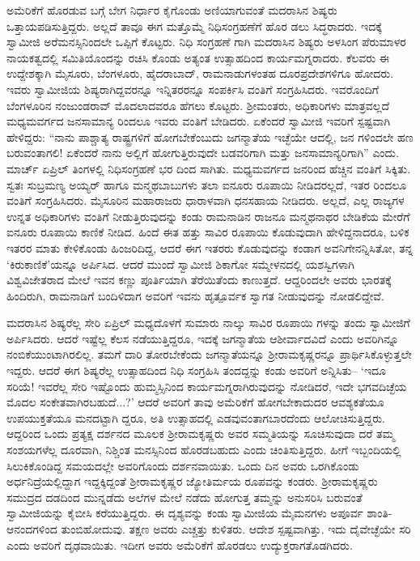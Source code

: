 ಅಮೆರಿಕೆಗೆ ಹೊರಡುವ ಬಗ್ಗೆ ಬೇಗ ನಿರ್ಧಾರ ಕೈಗೊಂಡು ಅಣಿಯಾಗುವಂತೆ ಮದರಾಸಿನ ಶಿಷ್ಯರು ಒತ್ತಾಯಪಡಿಸುತ್ತಿದ್ದರು. ಅಲ್ಲದೆ ತಾವೂ ಈಗ ಮತ್ತೊಮ್ಮೆ ನಿಧಿಸಂಗ್ರಹಣೆಗೆ ಹೊರ ಡಲು ಸಿದ್ಧರಾದರು. ಇದಕ್ಕೆ ಸ್ವಾಮೀಜಿ ಅರೆಮನಸ್ಸಿನಿಂದಲೇ ಒಪ್ಪಿಗೆ ಕೊಟ್ಟರು. ನಿಧಿ ಸಂಗ್ರಹಣೆ ಗಾಗಿ ಮದರಾಸಿನ ಶಿಷ್ಯರು ಅಳಸಿಂಗ ಪೆರುಮಾಳರ ನಾಯಕತ್ವದಲ್ಲಿ ಸಮಿತಿಯೊಂದನ್ನು ರಚಿಸಿ ಕೊಂಡು ಅತ್ಯಂತ ಉತ್ಸಾಹದಿಂದ ಕಾರ್ಯಮಗ್ನರಾದರು. ಕೆಲವರು ಈ ಉದ್ದೇಶಕ್ಕಾಗಿ ಮೈಸೂರು, ಬೆಂಗಳೂರು, ಹೈದರಾಬಾದ್, ರಾಮನಾಡುಗಳಂತಹ ದೂರಪ್ರದೇಶಗಳಿಗೂ ಹೋದರು. ಇವರು ಸ್ವಾಮೀಜಿಯ ಶಿಷ್ಯರಾಗಿದ್ದವರನ್ನೂ ಇನ್ನಿತರರನ್ನೂ ಸಂಪರ್ಕಿಸಿ ವಂತಿಗೆ ಸಂಗ್ರಹಿಸಿದರು. ಇವರೊಂದಿಗೆ ಬೆಂಗಳೂರಿನ ನಂಜುಂಡರಾವ್ ಮೊದಲಾದವರೂ ಹೆಗಲು ಕೊಟ್ಟರು. ಶ್ರೀಮಂತರು, ಅಧಿಕಾರಿಗಳು ಮಾತ್ರವಲ್ಲದೆ ಮಧ್ಯಮವರ್ಗದ ಜನಸಾಮಾನ್ಯ ರಿಂದಲೂ ಇವರು ವಂತಿಗೆ ಬೇಡಿದರು. ಏಕೆಂದರೆ ಸ್ವಾಮೀಜಿ ಇವರಿಗೆ ಸ್ಪಷ್ಟವಾಗಿ ಹೇಳಿದ್ದರು: “ನಾನು ಪಾಶ್ಚಾತ್ಯ ರಾಷ್ಟ್ರಗಳಿಗೆ ಹೋಗಬೇಕೆಂಬುದು ಜಗನ್ಮಾತೆಯ ಇಚ್ಛೆಯೇ ಆದಲ್ಲಿ, ಜನ ಗಳಿಂದಲೇ ಹಣ ಬರುವಂತಾಗಲಿ! ಏಕೆಂದರೆ ನಾನು ಅಲ್ಲಿಗೆ ಹೋಗುತ್ತಿರುವುದೇ ಬಡವರಿಗಾಗಿ ಮತ್ತು ಜನಸಾಮಾನ್ಯರಿಗಾಗಿ” ಎಂದು. ಮಾರ್ಚ್ ಏಪ್ರಿಲ್ ತಿಂಗಳಲ್ಲಿ ನಿಧಿಸಂಗ್ರಹಣೆ ಭರ ದಿಂದ ಸಾಗಿತು. ಮಧ್ಯಮವರ್ಗದ ಜನರಿಂದ ಹೆಚ್ಚಿನ ವಂತಿಗೆ ಸಿಕ್ಕಿತು. ಸ್ವತಃ ಸುಬ್ರಮಣ್ಯ ಅಯ್ಯರ್ ಹಾಗೂ ಮನ್ಮಥಬಾಬುಗಳು ತಲಾ ಐನೂರು ರೂಪಾಯಿ ನೀಡಿದರಲ್ಲದೆ, ಇತರ ರಿಂದಲೂ ವಂತಿಗೆ ಸಂಗ್ರಹಿಸಿದರು. ಮೈಸೂರಿನ ಮಹಾರಾಜರು ಧಾರಾಳವಾಗಿ ಧನಸಹಾಯ ನೀಡಿದರು. ಅಲ್ಲದೆ, ಎಲ್ಲ ರಾಜ್ಯಗಳ ಉನ್ನತ ಅಧಿಕಾರಿಗಳು ವಂತಿಗೆ ನೀಡುತ್ತಿರುವುದನ್ನು ಕಂಡು ರಾಮನಾಡಿನ ರಾಜನೂ ಮನ್ಮಥನಾಥರ ಬೇಡಿಕೆಯ ಮೇರೆಗೆ ಐನೂರು ರೂಪಾಯಿ ಕಾಣಿಕೆ ನೀಡಿದ. ಹಿಂದೆ ಈತ ಹತ್ತು ಸಾವಿರ ರೂಪಾಯಿ ಕೊಡುವುದಾಗಿ ಹೇಳಿದ್ದನಾದರೂ, ಬಳಿಕ ಇತರರ ಮಾತು ಕೇಳಿಕೊಂಡು ಹಿಂಜರಿದಿದ್ದ, ಆದರೆ ಈಗ ಇತರರು ಕೊಡುವುದನ್ನು ಕಂಡಾಗ ಅವನಿಗೇನನ್ನಿಸಿತೋ, ತನ್ನ ‘ಕಿರುಕಾಣಿಕೆ’ಯನ್ನೂ ಅರ್ಪಿಸಿದ. ಆದರೆ ಮುಂದೆ ಸ್ವಾಮೀಜಿ ಶಿಕಾಗೋ ಸಮ್ಮೇಳನದಲ್ಲಿ ಯಶಸ್ವಿಗಳಾಗಿ ವಿಶ್ವವಿಜೇತರಾದ ಮೇಲೆ ಇವನ ಕಣ್ಣು ಪೂರ್ತಿಯಾಗಿ ತೆರೆಯಿತೆಂದು ಕಾಣುತ್ತದೆ. ಆದ್ದರಿಂದಲೇ ಅವರು ಭಾರತಕ್ಕೆ ಹಿಂದಿರುಗಿ, ರಾಮನಾಡಿಗೆ ಬಂದಿಳಿದಾಗ ಅವರಿಗೆ ಇವನು ಹೃತ್ಪೂರ್ವಕ ಸ್ವಾಗತ ನೀಡುವುದನ್ನು ನೋಡಲಿದ್ದೇವೆ.

ಮದರಾಸಿನ ಶಿಷ್ಯರೆಲ್ಲ ಸೇರಿ ಏಪ್ರಿಲ್ ಮಧ್ಯದೊಳಗೆ ಸುಮಾರು ನಾಲ್ಕು ಸಾವಿರ ರೂಪಾಯಿ ಗಳನ್ನು ತಂದು ಸ್ವಾಮೀಜಿಗೆ ಅರ್ಪಿಸಿದರು. ಆದರೆ ಇಷ್ಟೆಲ್ಲ ಕೆಲಸ ನಡೆಯುತ್ತಿದ್ದರೂ, ಇದಕ್ಕೆ ಜಗನ್ಮಾತೆಯ ಆಶೀರ್ವಾದವಿದೆ ಎಂದು ಅವರಿಗಿನ್ನೂ ನಂಬಿಕೆಯುಂಟಾಗಿರಲಿಲ್ಲ. ತಮಗೆ ದಾರಿ ತೋರಬೇಕೆಂದು ಜಗನ್ಮಾತೆಯನ್ನೂ ಶ್ರೀರಾಮಕೃಷ್ಣರನ್ನೂ ಪ್ರಾರ್ಥಿಸಿಕೊಳ್ಳುತ್ತಲೇ ಇದ್ದರು. ಆದರೆ ಈಗ ಶಿಷ್ಯರೆಲ್ಲ ಉತ್ಸಾಹದಿಂದ ನಿಧಿ ಸಂಗ್ರಹಿಸಿ ತಂದದ್ದನ್ನು ಕಂಡು ಅವರಿಗೆ ಅನ್ನಿಸಿತು– ‘ಇದೂ ಸರಿಯೆ! ಇವರೆಲ್ಲ ಸೇರಿ ಇಷ್ಟೊಂದು ಹುಮ್ಮಸ್ಸಿನಿಂದ ಕಾರ್ಯಮಗ್ನರಾಗಿರುವುದನ್ನು ನೋಡಿದರೆ, ಇದೇ ಭಗವದಿಚ್ಛೆಯ ಮೊದಲ ಸಂಕೇತವಾಗಿರಬಹುದೆ...?’ ಆದರೆ ಅವರಿಗೆ ತಾವು ಅಮೆರಿಕೆಗೆ ಹೋಗಬೇಕಾದುದರ ಆವಶ್ಯಕತೆಯೂ ಉಪಯುಕ್ತತೆಯೂ ಮನದಟ್ಟಾಗಿ ದ್ದರೂ, ಅತಿ ಉತ್ಸಾಹದಲ್ಲಿ ಎಡವುವಂತಾಗಬಾರದೆಂದು ಆಲೋಚಿಸುತ್ತಿದ್ದರು. ಆದ್ದರಿಂದ ಒಂದು ಪ್ರತ್ಯಕ್ಷ ದರ್ಶನದ ಮೂಲಕ ಶ್ರೀರಾಮಕೃಷ್ಣರು ಅವರ ಸಮ್ಮತಿಯನ್ನು ಸೂಚಿಸುವುದಾ ದರೆ ತಮ್ಮ ಸಂಶಯಗಳೆಲ್ಲ ದೂರವಾಗಿ, ನಿಶ್ಚಿಂತ ಮನಸ್ಸಿನಿಂದ ಹೊರಡಬಹುದು ಎಂದು ಚಿಂತಿಸುತ್ತಿದ್ದರು. ಹೀಗೆ ಇಬ್ಬಂದಿಯಲ್ಲಿ ಸಿಲುಕಿಕೊಂಡಿದ್ದ ಸಮಯದಲ್ಲೇ ಅವರಿಗೊಂದು ದರ್ಶನವಾಯಿತು. ಒಂದು ದಿನ ಅವರು ಒರಗಿಕೊಂಡು ಅರ್ಧನಿದ್ರೆಯಲ್ಲಿದ್ದಾಗ ಇದ್ದಕ್ಕಿದ್ದಂತೆ ಶ್ರೀರಾಮಕೃಷ್ಣರ ಜ್ಯೋತಿರ್ಮಯ ರೂಪವನ್ನು ಕಂಡರು. ಶ್ರೀರಾಮಕೃಷ್ಣರು ಸಮುದ್ರದ ದಡದಿಂದ ಮುನ್ನಡೆದು ಅಲೆಗಳ ಮೇಲೆ ನಡೆದು ಹೋಗುತ್ತ ತಮ್ಮನ್ನು ಅನುಸರಿಸಿ ಬರುವಂತೆ ಸ್ವಾಮೀಜಿಯನ್ನು ಕೈಬೀಸಿ ಕರೆಯುತ್ತಿದ್ದರು. ಈ ದೃಶ್ಯವನ್ನು ಕಂಡು ಸ್ವಾಮೀಜಿಯ ಮೈಮನಗಳು ಅಪೂರ್ವ ಶಾಂತಿ-ಆನಂದಗಳಿಂದ ತುಂಬಿಹೋದುವು. ತಕ್ಷಣ ಅವರು ಎಚ್ಚತ್ತು ಕುಳಿತರು. ಆದೇಶ ಸ್ಪಷ್ಟವಾಗಿತ್ತು. ಇದು ದೈವೇಚ್ಛೆಯೇ ಸರಿ ಎಂದು ಅವರಿಗೆ ದೃಢವಾಯಿತು. ಇದೀಗ ಅವರು ಅಮೆರಿಕೆಗೆ ಹೊರಡಲು ಉದ್ಯುಕ್ತರಾಗತೊಡಗಿದರು.

